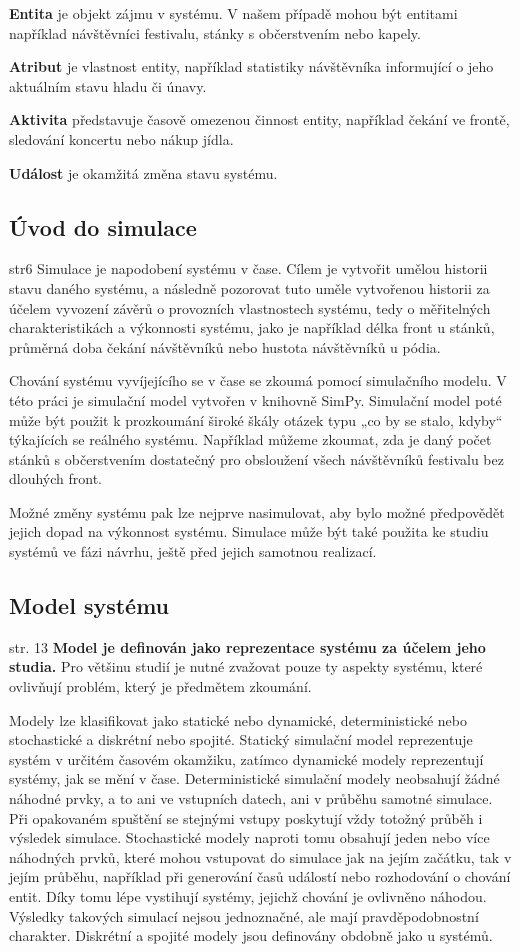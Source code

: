\documentclass[
  program=itp,
  biblatex,
  figures=false,
  glossaries,
  index
]{kidiplom}
\begin{document}
\noindent \textbf{Entita} je objekt zájmu v systému. V našem případě mohou být entitami například návštěvníci festivalu, stánky s občerstvením nebo kapely.

\noindent \textbf{Atribut} je vlastnost entity, například statistiky návštěvníka informující o jeho aktuálním stavu hladu či únavy.

\noindent \textbf{Aktivita} představuje časově omezenou činnost entity, například čekání ve frontě, sledování koncertu nebo nákup jídla.

\noindent \textbf{Událost} je okamžitá změna stavu systému. 


\subsection{Úvod do simulace}  str6
Simulace je napodobení systému v čase. Cílem je vytvořit umělou historii stavu daného systému, a následně pozorovat tuto uměle vytvořenou historii za účelem vyvození závěrů o provozních vlastnostech systému, tedy o měřitelných charakteristikách a výkonnosti systému, jako je například délka front u stánků, průměrná doba čekání návštěvníků nebo hustota návštěvníků u pódia. 

Chování systému vyvíjejícího se v čase se zkoumá pomocí simulačního modelu. V této práci je simulační model vytvořen v knihovně SimPy. Simulační model poté může být použit k prozkoumání široké škály otázek typu „co by se stalo, kdyby“ týkajících se reálného systému. Například můžeme zkoumat, zda je daný počet stánků s občerstvením dostatečný pro obsloužení všech návštěvníků festivalu bez dlouhých front. 

Možné změny systému pak lze nejprve nasimulovat, aby bylo možné předpovědět jejich dopad na výkonnost systému. Simulace může být také použita ke studiu systémů ve fázi návrhu, ještě před jejich samotnou realizací.

\subsection{Model systému} str. 13
{\bf Model je definován jako reprezentace systému za účelem jeho studia.} Pro většinu studií je nutné zvažovat pouze ty aspekty systému, které ovlivňují problém, který je předmětem zkoumání. 

Modely lze klasifikovat jako statické nebo dynamické, deterministické nebo stochastické a diskrétní nebo spojité. Statický simulační model reprezentuje systém v určitém časovém okamžiku, zatímco dynamické modely reprezentují systémy, jak se mění v čase. Deterministické simulační modely neobsahují žádné náhodné prvky, a to ani ve vstupních datech, ani v průběhu samotné simulace. Při opakovaném spuštění se stejnými vstupy poskytují vždy totožný průběh i výsledek simulace. Stochastické modely naproti tomu obsahují jeden nebo více náhodných prvků, které mohou vstupovat do simulace jak na jejím začátku, tak v jejím průběhu, například při generování časů událostí nebo rozhodování o chování entit. Díky tomu lépe vystihují systémy, jejichž chování je ovlivněno náhodou. Výsledky takových simulací nejsou jednoznačné, ale mají pravděpodobnostní charakter. Diskrétní a spojité modely jsou definovány obdobně jako u systémů.
\end{document}
